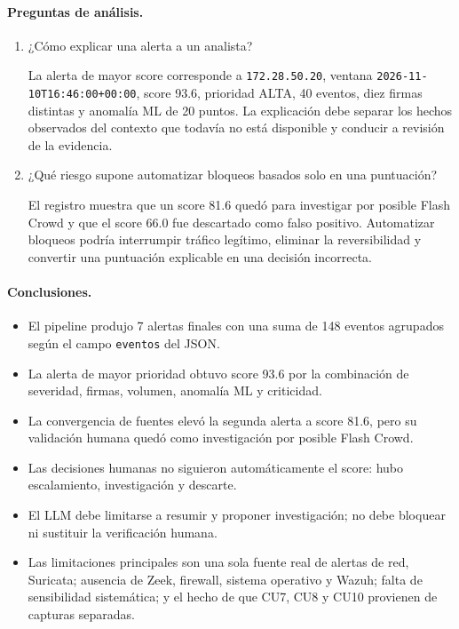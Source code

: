 \paragraph{Preguntas de análisis.}
\begin{enumerate}[leftmargin=*, topsep=2pt, itemsep=2pt]
\item ¿Cómo explicar una alerta a un analista?\par
La alerta de mayor score corresponde a \texttt{172.28.50.20}, ventana \texttt{2026-11-10T16:46:00+00:00}, score 93.6, prioridad ALTA, 40 eventos, diez firmas distintas y anomalía ML de 20 puntos. La explicación debe separar los hechos observados del contexto que todavía no está disponible y conducir a revisión de la evidencia.
\item ¿Qué riesgo supone automatizar bloqueos basados solo en una puntuación?\par
El registro muestra que un score 81.6 quedó para investigar por posible Flash Crowd y que el score 66.0 fue descartado como falso positivo. Automatizar bloqueos podría interrumpir tráfico legítimo, eliminar la reversibilidad y convertir una puntuación explicable en una decisión incorrecta.
\end{enumerate}

\paragraph{Conclusiones.}
\begin{itemize}
\item El pipeline produjo 7 alertas finales con una suma de 148 eventos agrupados según el campo \texttt{eventos} del JSON.
\item La alerta de mayor prioridad obtuvo score 93.6 por la combinación de severidad, firmas, volumen, anomalía ML y criticidad.
\item La convergencia de fuentes elevó la segunda alerta a score 81.6, pero su validación humana quedó como investigación por posible Flash Crowd.
\item Las decisiones humanas no siguieron automáticamente el score: hubo escalamiento, investigación y descarte.
\item El LLM debe limitarse a resumir y proponer investigación; no debe bloquear ni sustituir la verificación humana.
\item Las limitaciones principales son una sola fuente real de alertas de red, Suricata; ausencia de Zeek, firewall, sistema operativo y Wazuh; falta de sensibilidad sistemática; y el hecho de que CU7, CU8 y CU10 provienen de capturas separadas.
\end{itemize}

